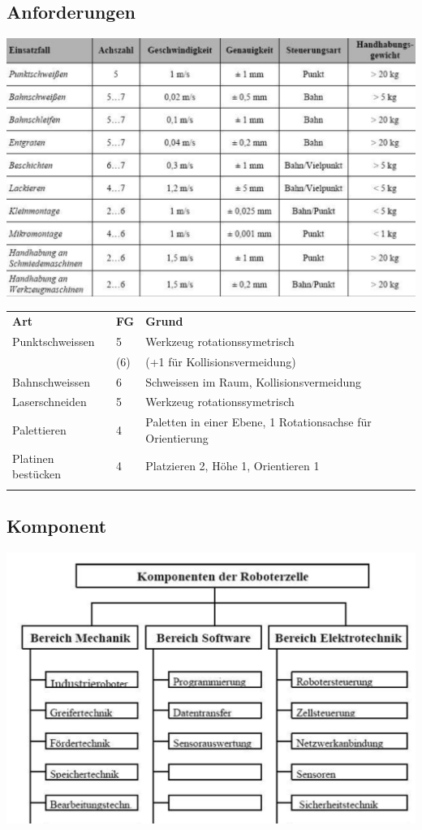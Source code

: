 \begin{minipage}{0.5\linewidth}
\subsection{Anforderungen}
\includegraphics[width=\linewidth]{./bilder/anforderung}
\begin{tabular}{lll}
	\textbf{Art}& \textbf{FG}&\textbf{Grund}\\
	Punktschweissen& 5& Werkzeug rotationssymetrisch\\
	&(6)&(+1 für Kollisionsvermeidung)\\
	Bahnschweissen&6&Schweissen im Raum, Kollisionsvermeidung\\
	Laserschneiden&5&Werkzeug rotationssymetrisch\\
	Palettieren&4&Paletten in einer Ebene, 1 Rotationsachse für Orientierung\\
	Platinen bestücken&4&Platzieren 2, Höhe 1, Orientieren 1\\
	&&\\
\end{tabular}
\end{minipage}

\begin{minipage}{0.5\linewidth}
    \subsection{Komponent}
    \includegraphics[width=\linewidth]{./bilder/komponent}
\end{minipage}

